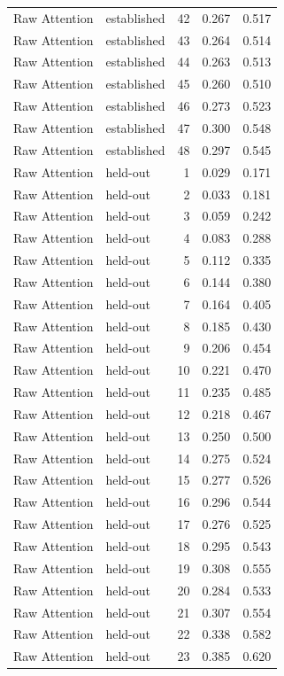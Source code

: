 \begin{tabular}{llrrr}
Raw Attention & established & 42 & 0.267 & 0.517 \\
Raw Attention & established & 43 & 0.264 & 0.514 \\
Raw Attention & established & 44 & 0.263 & 0.513 \\
Raw Attention & established & 45 & 0.260 & 0.510 \\
Raw Attention & established & 46 & 0.273 & 0.523 \\
Raw Attention & established & 47 & 0.300 & 0.548 \\
Raw Attention & established & 48 & 0.297 & 0.545 \\
Raw Attention & held-out & 1 & 0.029 & 0.171 \\
Raw Attention & held-out & 2 & 0.033 & 0.181 \\
Raw Attention & held-out & 3 & 0.059 & 0.242 \\
Raw Attention & held-out & 4 & 0.083 & 0.288 \\
Raw Attention & held-out & 5 & 0.112 & 0.335 \\
Raw Attention & held-out & 6 & 0.144 & 0.380 \\
Raw Attention & held-out & 7 & 0.164 & 0.405 \\
Raw Attention & held-out & 8 & 0.185 & 0.430 \\
Raw Attention & held-out & 9 & 0.206 & 0.454 \\
Raw Attention & held-out & 10 & 0.221 & 0.470 \\
Raw Attention & held-out & 11 & 0.235 & 0.485 \\
Raw Attention & held-out & 12 & 0.218 & 0.467 \\
Raw Attention & held-out & 13 & 0.250 & 0.500 \\
Raw Attention & held-out & 14 & 0.275 & 0.524 \\
Raw Attention & held-out & 15 & 0.277 & 0.526 \\
Raw Attention & held-out & 16 & 0.296 & 0.544 \\
Raw Attention & held-out & 17 & 0.276 & 0.525 \\
Raw Attention & held-out & 18 & 0.295 & 0.543 \\
Raw Attention & held-out & 19 & 0.308 & 0.555 \\
Raw Attention & held-out & 20 & 0.284 & 0.533 \\
Raw Attention & held-out & 21 & 0.307 & 0.554 \\
Raw Attention & held-out & 22 & 0.338 & 0.582 \\
Raw Attention & held-out & 23 & 0.385 & 0.620 \\

\end{tabular}
